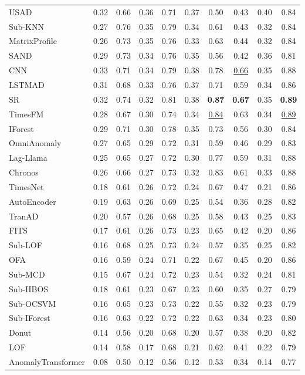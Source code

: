 \begin{table}
{\begin{tabular}{l|c|c|c|c|c|c|c|c|c}
USAD & 0.32 & 0.66 & 0.36 & 0.71 & 0.37 & 0.50 & 0.43 & 0.40 & 0.84 \\
Sub-KNN & 0.27 & 0.76 & 0.35 & 0.79 & 0.34 & 0.61 & 0.43 & 0.32 & 0.84 \\
MatrixProfile & 0.26 & 0.73 & 0.35 & 0.76 & 0.33 & 0.63 & 0.44 & 0.32 & 0.84 \\
SAND & 0.29 & 0.73 & 0.34 & 0.76 & 0.35 & 0.56 & 0.42 & 0.36 & 0.81 \\
CNN & 0.33 & 0.71 & 0.34 & 0.79 & 0.38 & 0.78 & \underline{0.66} & 0.35 & 0.88 \\
LSTMAD & 0.31 & 0.68 & 0.33 & 0.76 & 0.37 & 0.71 & 0.59 & 0.34 & 0.86 \\
SR & 0.32 & 0.74 & 0.32 & 0.81 & 0.38 & \textbf{0.87} & \textbf{0.67} & 0.35 & \textbf{0.89} \\
TimesFM & 0.28 & 0.67 & 0.30 & 0.74 & 0.34 & \underline{0.84} & 0.63 & 0.34 & \underline{0.89} \\
IForest & 0.29 & 0.71 & 0.30 & 0.78 & 0.35 & 0.73 & 0.56 & 0.30 & 0.84 \\
OmniAnomaly & 0.27 & 0.65 & 0.29 & 0.72 & 0.31 & 0.59 & 0.46 & 0.29 & 0.83 \\
Lag-Llama & 0.25 & 0.65 & 0.27 & 0.72 & 0.30 & 0.77 & 0.59 & 0.31 & 0.88 \\
Chronos & 0.26 & 0.66 & 0.27 & 0.73 & 0.32 & 0.83 & 0.61 & 0.33 & 0.88 \\
TimesNet & 0.18 & 0.61 & 0.26 & 0.72 & 0.24 & 0.67 & 0.47 & 0.21 & 0.86 \\
AutoEncoder & 0.19 & 0.63 & 0.26 & 0.69 & 0.25 & 0.54 & 0.36 & 0.28 & 0.82 \\
TranAD & 0.20 & 0.57 & 0.26 & 0.68 & 0.25 & 0.58 & 0.43 & 0.25 & 0.83 \\
FITS & 0.17 & 0.61 & 0.26 & 0.73 & 0.23 & 0.65 & 0.42 & 0.20 & 0.86 \\
Sub-LOF & 0.16 & 0.68 & 0.25 & 0.73 & 0.24 & 0.57 & 0.35 & 0.25 & 0.82 \\
OFA & 0.16 & 0.59 & 0.24 & 0.71 & 0.22 & 0.67 & 0.45 & 0.20 & 0.86 \\
Sub-MCD & 0.15 & 0.67 & 0.24 & 0.72 & 0.23 & 0.54 & 0.32 & 0.24 & 0.81 \\
Sub-HBOS & 0.18 & 0.61 & 0.23 & 0.67 & 0.23 & 0.60 & 0.35 & 0.27 & 0.79 \\
Sub-OCSVM & 0.16 & 0.65 & 0.23 & 0.73 & 0.22 & 0.55 & 0.32 & 0.23 & 0.79 \\
Sub-IForest & 0.16 & 0.63 & 0.22 & 0.72 & 0.22 & 0.63 & 0.34 & 0.23 & 0.80 \\
Donut & 0.14 & 0.56 & 0.20 & 0.68 & 0.20 & 0.57 & 0.38 & 0.20 & 0.82 \\
LOF & 0.14 & 0.58 & 0.17 & 0.68 & 0.21 & 0.62 & 0.41 & 0.22 & 0.79 \\
AnomalyTransformer & 0.08 & 0.50 & 0.12 & 0.56 & 0.12 & 0.53 & 0.34 & 0.14 & 0.77 \\
\bottomrule
\end{tabular}
}
\end{table}
